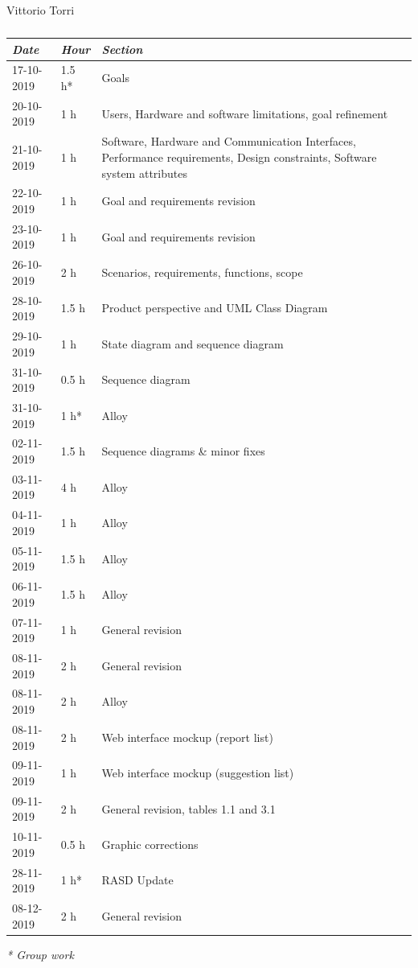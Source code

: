 \documentclass[a4paper]{report}
\begin{document}
\begin{table}[H]
\centering
Vittorio Torri \\
\begin{tabular}{p{2cm}p{1.5cm}p{7cm}}
\toprule
\textit{Date} & \textit{Hour} & \textit{Section} \\ \midrule
17-10-2019 & 1.5 h* & Goals \\ \midrule
20-10-2019 & 1 h & Users, Hardware and software limitations, goal refinement \\ \midrule
21-10-2019 & 1 h & Software, Hardware and Communication Interfaces, Performance requirements, Design constraints, Software system attributes \\ \midrule
22-10-2019 & 1 h & Goal and requirements revision \\ \midrule
23-10-2019 & 1 h & Goal and requirements revision \\ \midrule
26-10-2019 & 2 h & Scenarios, requirements, functions, scope \\  \midrule
28-10-2019 & 1.5 h & Product perspective and UML Class Diagram \\ \midrule
29-10-2019 & 1 h & State diagram and sequence diagram \\ \midrule
31-10-2019 & 0.5 h & Sequence diagram \\ \midrule
31-10-2019 & 1 h* & Alloy \\ \midrule
02-11-2019 & 1.5 h & Sequence diagrams \& minor fixes \\ \midrule
03-11-2019 & 4 h & Alloy \\ \midrule
04-11-2019 & 1 h & Alloy \\ \midrule 
05-11-2019 & 1.5 h & Alloy \\ \midrule
06-11-2019 & 1.5 h & Alloy \\ \midrule
07-11-2019 & 1 h & General revision \\ \midrule
08-11-2019 & 2 h & General revision \\ \midrule
08-11-2019 & 2 h & Alloy \\ \midrule
08-11-2019 & 2 h & Web interface mockup (report list) \\ \midrule
09-11-2019 & 1 h & Web interface mockup (suggestion list) \\ \midrule
09-11-2019 & 2 h & General revision, tables 1.1 and 3.1\\ \midrule
10-11-2019 & 0.5 h & Graphic corrections\\ \midrule
28-11-2019 & 1 h* & RASD Update \\ \midrule
08-12-2019 & 2 h & General revision\\
\bottomrule
\end{tabular}
\caption[Vittorio Torri's effort table]{}
\end{table}
\textit{* Group work}
\end{document}
